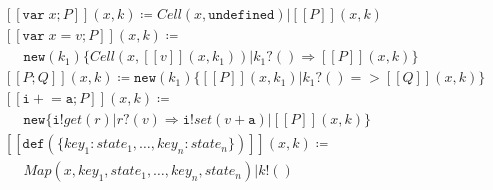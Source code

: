 \documentclass[]{acm_proc_article-sp}
\newcommand{\ldb}{[\![}
\newcommand{\rdb}{]\!]}
\newcommand{\id}[1]{\texttt{#1}}
\newcommand{\juxtap}{\mathbin{\id{|}}}
\newcommand{\binpar}[2]{#1 \juxtap #2}
\newcommand{\meaningof}[1]{\ldb #1 \rdb}
\newcommand{\defneqls}{\coloneqq}
\numberwithin{equation}{subsection}
\begin{document}
\begin{equation*}
  \begin{aligned}
    & \meaningof{\texttt{var}\; x; P}( x, k ) \defneqls \binpar{Cell( x, \texttt{undefined} )}{\meaningof{P}( x, k )} \\
    & \meaningof{\texttt{var}\; x = v; P}( x, k ) \defneqls \\
    & \;\;\;\;\;\texttt{new}(k_1)\{ \binpar{Cell( x, \meaningof{ v }(x, k_1 ) )}{k_1?() \Rightarrow \meaningof{P}( x, k )}\} \\
    & \meaningof{ P ; Q }( x, k ) \defneqls \texttt{new}(k_1)\{ \binpar{\meaningof{ P }( x, k_1 )}{ k_1?() => \meaningof{ Q }( x, k )} \} \\
    & \meaningof{ \texttt{i} +\!= \texttt{a} ; P }( x, k ) \defneqls \\
    & \;\;\;\;\;\texttt{new} \{ \binpar{\binpar{\texttt{i} ! get( r )}{r?( v ) \Rightarrow \texttt{i}! set( v + \texttt{a} ) }}{\meaningof{P}( x, k )} \}\\
    & \meaningof{\texttt{def}(\{key_1: state_1, \ldots, key_n: state_n\})}(x, k) \defneqls \\
    & \;\;\;\;\;\binpar{ Map(x, key_1, state_1, \ldots, key_n, state_n)}{k!()} \\
  \end{aligned}
\end{equation*}
\end{document}
